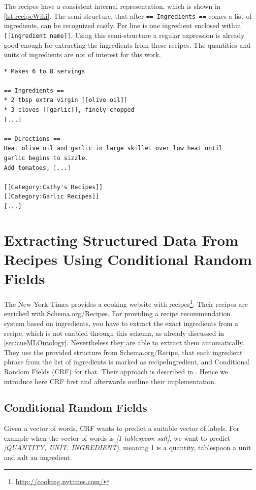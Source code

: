 \documentclass[12pt, twoside]{report}
\begin{document}
The recipes have a consistent internal representation, which is shown in \cref{lst:recipeWiki}. The semi-structure, that after \texttt{== Ingredients ==} comes a list of ingredients, can be recognized easily. Per line is one ingredient enclosed within \texttt{[[ingredient name]]}. Using this semi-structure a regular expression is already good enough for extracting the ingredients from these recipes. The quantities and units of ingredients are not of interest for this work. 

\begin{lstlisting}[frame=single, basicstyle=\footnotesize\ttfamily,caption={Shortened example recipe from \\ http://recipes.wikia.com/wiki/Recipes\_Wiki}, label=lst:recipeWiki]
* Makes 6 to 8 servings

== Ingredients ==
* 2 tbsp extra virgin [[olive oil]]
* 3 cloves [[garlic]], finely chopped
[...]

== Directions ==
Heat olive oil and garlic in large skillet over low heat until
garlic begins to sizzle.
Add tomatoes, [...]

[[Category:Cathy's Recipes]]
[[Category:Garlic Recipes]]
[...]
\end{lstlisting}


\section{Extracting Structured Data From Recipes Using Conditional Random Fields}\label{sec:crfzeit}
The New York Times provides a cooking website with recipes\footnote{\url{http://cooking.nytimes.com/}}. Their recipes are enriched with Schema.org/Recipes. For providing a recipe recommendation system based on ingredients, you have to extract the exact ingredients from a recipe, which is not enabled through this schema, as already discussed in \cref{sec:cueMLOntology}. Nevertheless they are able to extract them automatically. They use the provided structure from Schema.org/Recipe, that each ingredient phrase from the list of ingredients is marked as recipeIngredient, and Conditional Random Fields (CRF) for that. Their approach is described in \parencite{CRFZeit}. Hence we introduce here CRF first and afterwards outline their implementation.  

\subsection{Conditional Random Fields}
Given a vector of words, CRF wants to predict a suitable vector of labels. For example when the vector of words is \textit{[1 tablespoon salt]}, we want to predict \textit{[QUANTITY, UNIT, INGREDIENT]}, meaning 1 is a quantity, tablespoon a unit and salt an ingredient.
\end{document}
